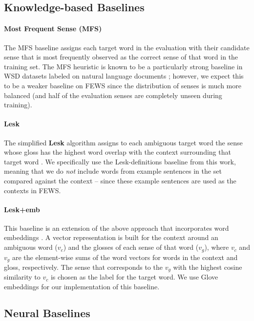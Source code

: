 \documentclass[11pt,a4paper]{article}
\begin{document}
\subsection{Knowledge-based Baselines}

\paragraph{Most Frequent Sense (MFS)} The MFS baseline assigns each target word in the evaluation with their candidate sense that is most frequently observed as the correct sense of that word in the training set. The MFS heuristic is known to be a particularly strong baseline in WSD datasets labeled on natural language documents \cite{kilgarriff2004dominant}; however, we expect this to be a weaker baseline on FEWS since the distribution of senses is much more balanced (and half of the evaluation senses are completely unseen during training).

\paragraph{Lesk} The simplified \textbf{Lesk} algorithm assigns to each ambiguous target word the sense whose gloss has the highest word overlap with the context surrounding that target word \cite{kilgarriff2000framework}. We specifically use the Lesk-definitions baseline from this work, meaning that we do \textit{not} include words from example sentences in the set compared against the context -- since these example sentences are used as the contexts in FEWS.

\paragraph{Lesk+emb} This baseline is an extension of the above approach that incorporates word embeddings \cite{basile2014enhanced}. A vector representation is built for the context around an ambiguous word ($v_c$) and the glosses of each sense of that word ($v_g$), where $v_c$ and $v_g$ are the element-wise sums of the word vectors for words in the context and gloss, respectively. The sense that corresponds to the $v_g$ with the highest cosine similarity to $v_c$ is chosen as the label for the target word. We use Glove embeddings \cite{pennington2014glove} for our implementation of this baseline. 
 
\subsection{Neural Baselines} 
\end{document}
